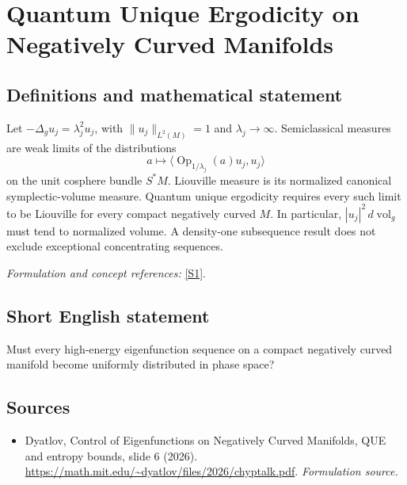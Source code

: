 \documentclass[11pt]{article}
\begin{document}
\section*{\texorpdfstring{Quantum Unique Ergodicity on Negatively Curved Manifolds}{Quantum Unique Ergodicity on Negatively Curved Manifolds}}\label{30001926}
\subsection{Definitions and mathematical statement}
Let $-\Delta_g u_j=\lambda_j^2u_j$, with $\|u_j\|_{L^2(M)}=1$ and $\lambda_j\to\infty$. Semiclassical measures are weak limits of the distributions
\[
 a\longmapsto\langle\operatorname{Op}_{1/\lambda_j}(a)u_j,u_j\rangle
\]
on the unit cosphere bundle $S^*M$. Liouville measure is its normalized canonical symplectic-volume measure. Quantum unique ergodicity requires every such limit to be Liouville for every compact negatively curved $M$. In particular, $|u_j|^2\,d\operatorname{vol}_g$ must tend to normalized volume. A density-one subsequence result does not exclude exceptional concentrating sequences.
\par\smallskip\textit{Formulation and concept references:} \href{https://math.mit.edu/~dyatlov/files/2026/chyptalk.pdf}{[S1]}.

\subsection{Short English statement}
Must every high-energy eigenfunction sequence on a compact negatively curved manifold become uniformly distributed in phase space?
\subsection{Sources}
\begin{itemize}
\item[S1]Dyatlov, Control of Eigenfunctions on Negatively Curved Manifolds, QUE and entropy bounds, slide 6 (2026).
\url{https://math.mit.edu/~dyatlov/files/2026/chyptalk.pdf}.
\textit{Formulation source.}
\end{itemize}
\end{document}
